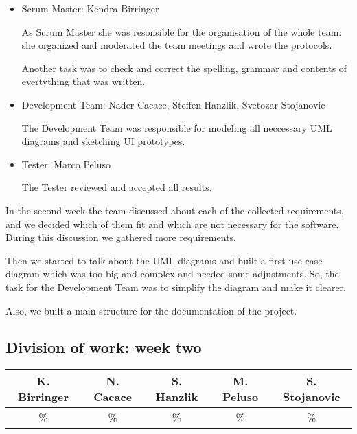 \documentclass[a4paper, 12pt]{article}
\begin{document}
\begin{itemize}
\item Scrum Master: Kendra Birringer


As Scrum Master she was resonsible for the organisation of the whole team: she organized and moderated the team meetings and wrote the protocols. 

Another task was to check and correct the spelling, grammar and contents of evertything that was written.

\item Development Team: Nader Cacace, Steffen Hanzlik, Svetozar Stojanovic

The Development Team was responsible for modeling all neccessary UML diagrams and sketching UI prototypes.

\item Tester: Marco Peluso

The Tester reviewed and accepted all results.
\end{itemize}


In the second week the team discussed about each of the collected requirements, and we decided which of them fit and which are not necessary for the software. During this discussion we gathered more requirements.

Then we started to talk about the UML diagrams and built a first use case diagram which was too big and complex and needed some adjustments. So, the task for the Development Team was to simplify the diagram and make it clearer.

Also, we built a main structure for the documentation of the project.

\subsection{Division of work: week two}
\begin{table}[h]
\centering
\setlength{\tabcolsep}{12pt}
\begin{tabular}{|c|c|c|c|c|}
\hline
K. Birringer & N. Cacace & S. Hanzlik & M. Peluso & S. Stojanovic\\
\hline
\% & \% & \% & \% & \% \\ 
\hline
\end{tabular}
\end{table}
\end{document}
